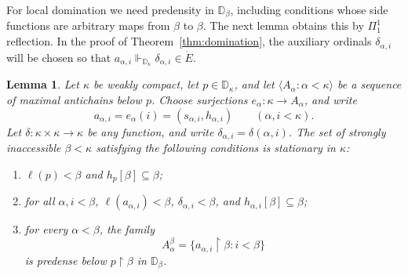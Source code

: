 \documentclass[10pt,a4paper]{amsart}
\newtheorem{lemma}[theorem]{Lemma}
\theoremstyle{definition}
\theoremstyle{remark}
\newcommand{\D}{\mathbb D}
\begin{document}
For local domination we need predensity in \(\D_\beta\), including
conditions whose side functions are arbitrary maps from \(\beta\)
to \(\beta\). The next lemma obtains this by \(\Pi^1_1\)
reflection. In the proof of Theorem~\ref{thm:domination}, the
auxiliary ordinals \(\delta_{\alpha,i}\) will be chosen so that
\(a_{\alpha,i}\Vdash_{\D_\kappa}\delta_{\alpha,i}\in\dot E\).


\begin{lemma}\label{lem:reflection}
Let \(\kappa\) be weakly compact, let \(p\in\D_\kappa\), and
let \(\langle A_\alpha:\alpha<\kappa\rangle\) be a sequence of
maximal antichains below \(p\). Choose surjections
\(e_\alpha:\kappa\to A_\alpha\), and write
\[
 a_{\alpha,i}=e_\alpha(i)
             =(s_{\alpha,i},h_{\alpha,i})
                    \qquad(\alpha,i<\kappa).
\]
Let \(\delta:\kappa\times\kappa\to\kappa\) be any function,
and write \(\delta_{\alpha,i}=\delta(\alpha,i)\).
The set of strongly inaccessible \(\beta<\kappa\) satisfying the
following conditions is stationary in \(\kappa\):
\begin{enumerate}[label=\textup{(\roman*)}]
\item \(\ell(p)<\beta\) and \(h_p[\beta]\subseteq\beta\);
\item for all \(\alpha,i<\beta\),
      \(\ell(a_{\alpha,i})<\beta\),
      \(\delta_{\alpha,i}<\beta\), and
      \(h_{\alpha,i}[\beta]\subseteq\beta\);
\item for every \(\alpha<\beta\), the family
\[
 A_\alpha^\beta=
 \{a_{\alpha,i}\restriction\beta:i<\beta\}
\]
is predense below \(p\restriction\beta\) in \(\D_\beta\).
\end{enumerate}
\end{lemma}
\end{document}
